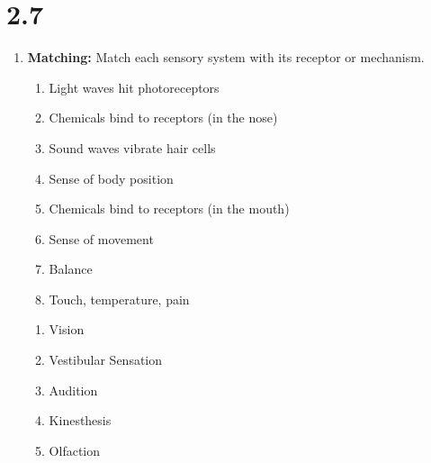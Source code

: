 
\section*{2.7}

\begin{enumerate}[label=\textbf{Q2.7.\arabic*}]
      \item \textbf{Matching:} Match each sensory system with its receptor or mechanism.
            \begin{wordbox}
                  \begin{enumerate}[label=(\alph*)]
                        \item Light waves hit photoreceptors
                        \item Chemicals bind to receptors (in the nose)
                        \item Sound waves vibrate hair cells
                        \item Sense of body position
                        \item Chemicals bind to receptors (in the mouth)
                        \item Sense of movement
                        \item Balance
                        \item Touch, temperature, pain
                  \end{enumerate}
            \end{wordbox}
            \begin{enumerate}[label=(\arabic*)]
                  \item Vision \quad \dotfill \quad \underline{\hspace{1cm}} \\
                  \item Vestibular Sensation \quad \dotfill \quad \underline{\hspace{1cm}} \\
                  \item Audition \quad \dotfill \quad \underline{\hspace{1cm}} \\
                  \item Kinesthesis \quad \dotfill \quad \underline{\hspace{1cm}} \\
                  \item Olfaction \quad \dotfill \quad \underline{\hspace{1cm}} \\

\end{enumerate}
\end{enumerate}
